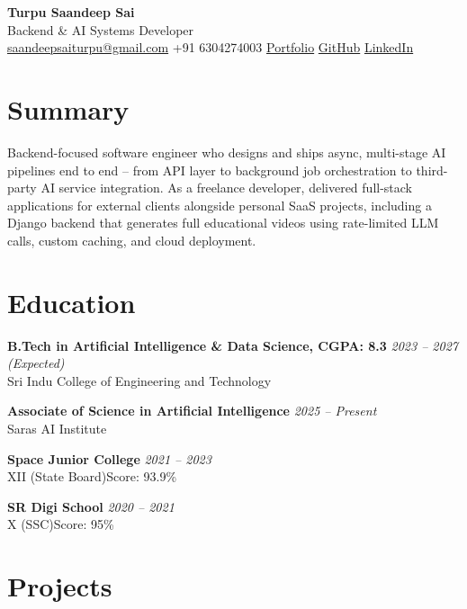 \documentclass[a4paper,10pt]{article}
\newcommand{\entry}[2]{%
  \noindent\textbf{#1} \hfill \textit{#2}\\[0pt]
}
\begin{document}
\begin{center}
{\huge \color{accent}\textbf{Turpu Saandeep Sai}} \\[3pt]
{\large Backend \& AI Systems Developer} \\[5pt]
\href{mailto:saandeepsaiturpu@gmail.com}{saandeepsaiturpu@gmail.com}
\;\textbullet\;
+91 6304274003
\;\textbullet\;
\href{https://portfolio-lyart-nu-sc7l5tytkt.vercel.app/}{Portfolio}
\;\textbullet\;
\href{https://github.com/Saandeep-Sai}{GitHub}
\;\textbullet\;
\href{https://www.linkedin.com/in/saandeep-sai/}{LinkedIn}
\end{center}

\section{Summary}
Backend-focused software engineer who designs and ships async, multi-stage AI pipelines end to end -- from API layer to background job orchestration to third-party AI service integration. As a freelance developer, delivered full-stack applications for external clients alongside personal SaaS projects, including a Django backend that generates full educational videos using rate-limited LLM calls, custom caching, and cloud deployment.

\section{Education}
\entry{B.Tech in Artificial Intelligence \& Data Science, CGPA: 8.3}{2023 -- 2027 (Expected)}
Sri Indu College of Engineering and Technology

\vspace{2pt}

\entry{Associate of Science in Artificial Intelligence}{2025 -- Present}
Saras AI Institute

\vspace{2pt}

\entry
    {Space Junior College}{2021 -- 2023}
    {XII (State Board)}{Score: 93.9\%}

\vspace{2pt}

\entry
    {SR Digi School}{2020 -- 2021}
    {X (SSC)}{Score: 95\%}

    


\section{Projects}
\end{document}
